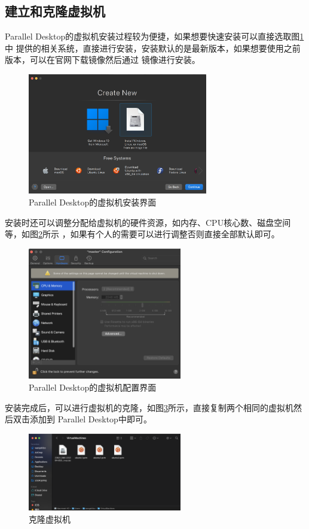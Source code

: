 \documentclass{article}
\begin{document}
\subsection{建立和克隆虚拟机}
\indent Parallel Desktop的虚拟机安装过程较为便捷，如果想要快速安装可以直接选取图\ref{fig:1}中
提供的相关系统，直接进行安装，安装默认的是最新版本，如果想要使用之前版本，可以在官网下载镜像然后通过
镜像进行安装。
\begin{figure}[H]
    \centering
    \includegraphics[width=0.7\textwidth]{image.png}
    \caption{Parallel Desktop的虚拟机安装界面}
    \label{fig:1}
\end{figure}
\indent 安装时还可以调整分配给虚拟机的硬件资源，如内存、CPU核心数、磁盘空间等，如图\ref{fig:2}所示
，如果有个人的需要可以进行调整否则直接全部默认即可。
\begin{figure}[H]
    \centering
    \includegraphics[width=0.6\textwidth]{image1.png}
    \caption{Parallel Desktop的虚拟机配置界面}
    \label{fig:2}
\end{figure}
\indent 安装完成后，可以进行虚拟机的克隆，如图\ref{fig:3}所示，直接复制两个相同的虚拟机然后双击添加到
Parallel Desktop中即可。
\begin{figure}[H]
    \centering
    \includegraphics[width=0.6\textwidth]{image2.png}
    \caption{克隆虚拟机}
    \label{fig:3}
\end{figure}
\end{document}
